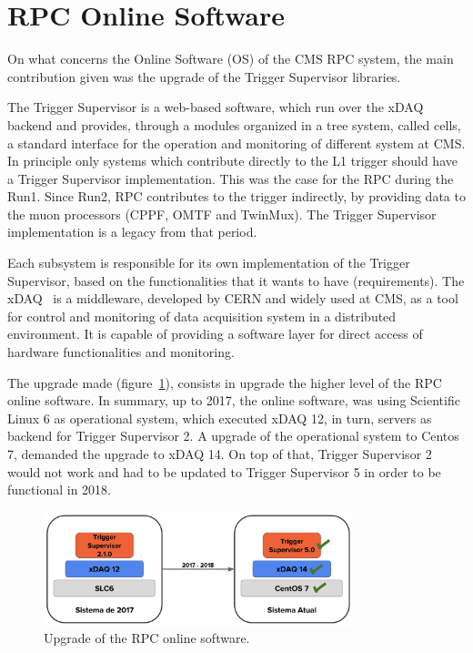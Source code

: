 \section{RPC Online Software}

On what concerns the Online Software (OS) of the CMS RPC system, the main contribution given was the upgrade of the Trigger Supervisor libraries.

The Trigger Supervisor is a web-based software, which run over the xDAQ backend and provides, through a modules organized in a tree system, called cells, a standard interface for the operation and monitoring of different system at CMS. In principle only systems which contribute directly to the L1 trigger should have a Trigger Supervisor implementation. This was the case for the  RPC during the Run1. Since Run2, RPC contributes to the trigger indirectly, by providing data to the muon processors (CPPF, OMTF and TwinMux). The Trigger Supervisor implementation is a legacy from that period.

Each subsystem is responsible for its own implementation of the Trigger Supervisor, based on the functionalities that it wants to have (requirements). The xDAQ~\cite{xdaq} is a middleware, developed by CERN and widely used at CMS, as a tool for control and monitoring of data acquisition system in a distributed environment. It is capable of providing a software layer for direct access of hardware functionalities and monitoring.

The upgrade made (figure~\ref{ts_upgrade}), consists in upgrade the higher level of the RPC online software. In summary, up to 2017, the online software, was using Scientific Linux 6 as operational system, which executed xDAQ 12, in turn, servers as backend for Trigger Supervisor 2. A upgrade of the operational system to Centos 7, demanded the upgrade to xDAQ 14. On top of that, Trigger Supervisor 2 would not work and had to be updated to Trigger Supervisor 5 in order to be functional in 2018.

\begin{figure}[h]
\begin{center}
\includegraphics[width=0.8\textwidth,keepaspectratio]{figures_and_tables/rpc/ts_upgrade.png}
\end{center}
\caption{Upgrade of the RPC online software.}\label{ts_upgrade}
\end{figure}

